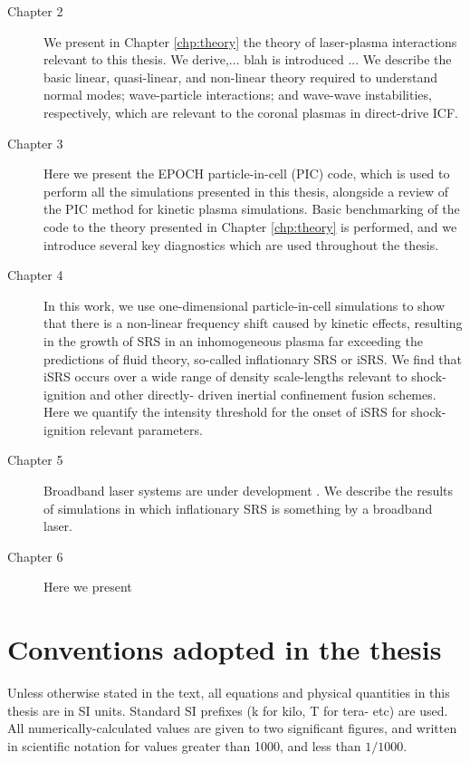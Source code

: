\begin{description}
	\item[Chapter 2] We present in Chapter \ref{chp:theory} the theory of laser-plasma interactions relevant to this thesis. We derive,... blah is introduced ... We describe the basic linear, quasi-linear, and non-linear theory required to understand normal modes; wave-particle interactions; and wave-wave instabilities, respectively, which are relevant to the coronal plasmas in direct-drive ICF.
	
	\item[Chapter 3] Here we present the EPOCH particle-in-cell (\acrshort{PIC}) code, which is used to perform all the simulations presented in this thesis, alongside a review of the PIC method for kinetic plasma simulations. Basic benchmarking of the code to the theory presented in Chapter \ref{chp:theory} is performed, and we introduce several key diagnostics which are used throughout the thesis.
	 
	\item[Chapter 4] In this work, we use one-dimensional particle-in-cell 		
		simulations to show that there is a non-linear frequency shift caused  
		by kinetic effects, resulting in the growth of SRS in an inhomogeneous 
		plasma far exceeding the predictions of fluid theory, so-called 
		inflationary SRS or iSRS. We find that iSRS occurs over a wide range of 
		density scale-lengths relevant to shock-ignition and other directly-
		driven inertial confinement fusion schemes. Here we quantify the 
		intensity threshold for the onset of iSRS for shock-ignition relevant 
		parameters.
	\item[Chapter 5] Broadband laser systems are under development . We 	
		describe the results of simulations in which inflationary SRS is 	
		something by a broadband laser.
	\item[Chapter 6] Here we present 
\end{description}

\section*{Conventions adopted in the thesis}
Unless otherwise stated in the text, all equations and physical quantities in this thesis are in SI units. Standard SI prefixes (k for kilo, T for tera- etc) are used. All numerically-calculated values are given to two significant figures, and written in scientific notation for values greater than 1000, and less than $1/1000$.

%
%
